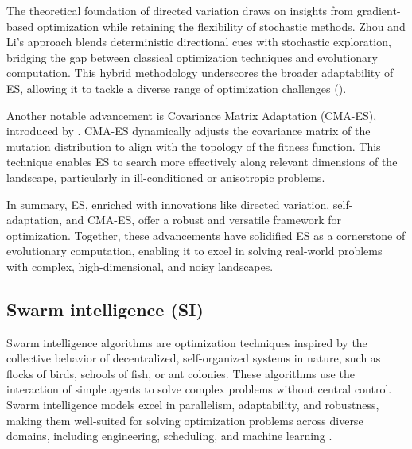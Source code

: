The theoretical foundation of directed variation draws on insights from gradient-based optimization while retaining the flexibility of stochastic methods. Zhou and Li's approach blends deterministic directional cues with stochastic exploration, bridging the gap between classical optimization techniques and evolutionary computation. This hybrid methodology underscores the broader adaptability of ES, allowing it to tackle a diverse range of optimization challenges (\cite{zhou2003directed,beyer2002evolution}).

Another notable advancement is Covariance Matrix Adaptation (CMA-ES), introduced by \textcite{hansen2001completely}. CMA-ES dynamically adjusts the covariance matrix of the mutation distribution to align with the topology of the fitness function. This technique enables ES to search more effectively along relevant dimensions of the landscape, particularly in ill-conditioned or anisotropic problems. %


In summary, ES, enriched with innovations like directed variation, self-adaptation, and CMA-ES, offer a robust and versatile framework for optimization. %
Together, these advancements have solidified ES as a cornerstone of evolutionary computation, enabling it to excel in solving real-world problems with complex, high-dimensional, and noisy landscapes.



\subsection{Swarm intelligence (SI)} 
Swarm intelligence algorithms are optimization techniques inspired by the collective behavior of decentralized, self-organized systems in nature, such as flocks of birds, schools of fish, or ant colonies. These algorithms use the interaction of simple agents to solve complex problems without central control. Swarm intelligence models excel in parallelism, adaptability, and robustness, making them well-suited for solving optimization problems across diverse domains, including engineering, scheduling, and machine learning \parencite{kennedy1995particle}.

